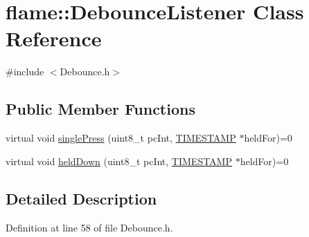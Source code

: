 \hypertarget{classflame_1_1_debounce_listener}{\section{flame\-:\-:Debounce\-Listener Class Reference}
\label{classflame_1_1_debounce_listener}
}


{\ttfamily \#include $<$Debounce.\-h$>$}

\subsection*{Public Member Functions}
\begin{DoxyCompactItemize}
\item 
virtual void \hyperlink{classflame_1_1_debounce_listener_afc43aff931408936c92c7d0b9fed139c}{single\-Press} (uint8\-\_\-t pc\-Int, \hyperlink{namespaceflame_ad90347e9ea7e54907966260ec5c7d22f}{T\-I\-M\-E\-S\-T\-A\-M\-P} $\ast$held\-For)=0
\item 
virtual void \hyperlink{classflame_1_1_debounce_listener_af08b1a813aa91016f375a7c8410f95ad}{held\-Down} (uint8\-\_\-t pc\-Int, \hyperlink{namespaceflame_ad90347e9ea7e54907966260ec5c7d22f}{T\-I\-M\-E\-S\-T\-A\-M\-P} $\ast$held\-For)=0
\end{DoxyCompactItemize}


\subsection{Detailed Description}


Definition at line 58 of file Debounce.\-h.



